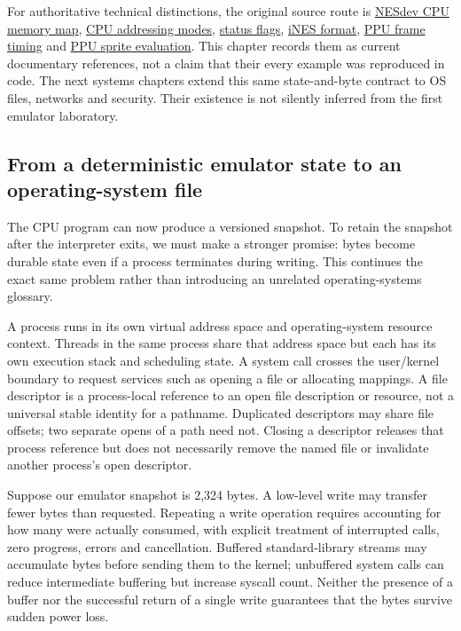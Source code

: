 For authoritative technical distinctions, the original source route is \href{https://www.nesdev.org/wiki/CPU_memory_map}{NESdev CPU memory map}, \href{https://www.nesdev.org/wiki/Addressing_modes}{CPU addressing modes}, \href{https://www.nesdev.org/wiki/Status_flag}{status flags}, \href{https://www.nesdev.org/wiki/INES}{iNES format}, \href{https://www.nesdev.org/wiki/PPU_frame_timing}{PPU frame timing} and \href{https://www.nesdev.org/wiki/PPU_sprite_evaluation}{PPU sprite evaluation}. This chapter records them as current documentary references, not a claim that their every example was reproduced in code. The next systems chapters extend this same state-and-byte contract to OS files, networks and security. Their existence is not silently inferred from the first emulator laboratory.

\subsection{From a deterministic emulator state to an operating-system file}\label{06-engine-ii-ch042-from-a-deterministic-emulator-state-to-an-operating-system-file}

\hypertarget{06-engine-ii-ch042-from-a-deterministic-emulator-state-to-an-operating-system-file}{}

The CPU program can now produce a versioned snapshot. To retain the snapshot after the interpreter exits, we must make a stronger promise: bytes become durable state even if a process terminates during writing. This continues the exact same problem rather than introducing an unrelated operating-systems glossary.

A process runs in its own virtual address space and operating-system resource context. Threads in the same process share that address space but each has its own execution stack and scheduling state. A system call crosses the user/kernel boundary to request services such as opening a file or allocating mappings. A file descriptor is a process-local reference to an open file description or resource, not a universal stable identity for a pathname. Duplicated descriptors may share file offsets; two separate opens of a path need not. Closing a descriptor releases that process reference but does not necessarily remove the named file or invalidate another process's open descriptor.

Suppose our emulator snapshot is 2,324 bytes. A low-level write may transfer fewer bytes than requested. Repeating a write operation requires accounting for how many were actually consumed, with explicit treatment of interrupted calls, zero progress, errors and cancellation. Buffered standard-library streams may accumulate bytes before sending them to the kernel; unbuffered system calls can reduce intermediate buffering but increase syscall count. Neither the presence of a buffer nor the successful return of a single write guarantees that the bytes survive sudden power loss.

